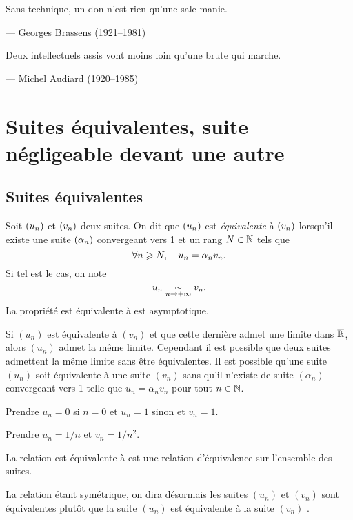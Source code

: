 \documentclass{magnolia}
\begin{document}
\setlength{}
\epigraph{\og Sans technique, un don n'est rien qu'une sale manie.\fg}{--- {\sc Georges Brassens (1921--1981)}}
\setlength{}
\epigraph{\og Deux intellectuels assis vont moins loin qu'une brute qui marche. \fg}{--- {\sc Michel Audiard (1920--1985)}}

\magtoc


\section{Suites équivalentes, suite négligeable devant une autre}

\subsection{Suites équivalentes}

\begin{definition}[utile=-3]
Soit $\left(u_n\right)$ et $\left(v_n\right)$ deux suites. On dit que $\left(u_n\right)$ est \emph{équivalente} à
$\left(v_n\right)$ lorsqu'il existe une suite $\left(\alpha_n\right)$ convergeant vers 1 et un rang
$N\in\mathbb{N}$ tels que
\[\forall n\geqslant N ,\quad u_n=\alpha_n v_n.\]
Si tel est le cas, on note
\[u_n \underset{n\rightarrow +\infty}{\sim} v_n.\]
La propriété \og est équivalente à \fg est asymptotique.
\end{definition}

\begin{remarques}
\remarque Si $(u_n)$ est équivalente à $(v_n)$ et que cette dernière admet une
  limite dans $\overline{\mathbb{R}}$, alors $(u_n)$ admet la même limite. Cependant
  il est possible que deux suites admettent la même limite sans être
  équivalentes.
\remarque Il est possible qu'une suite $(u_n)$ soit équivalente à une suite
  $(v_n)$ sans qu'il n'existe de suite $(\alpha_n)$ convergeant vers 1 telle que
  $u_n=\alpha_n v_n$ pour tout $n\in\mathbb{N}$.
  \begin{sol}
  Prendre $u_n=0$ si $n=0$ et $u_n=1$ sinon et $v_n=1$.
  \end{sol}
\end{remarques}
\begin{sol}
Prendre $u_n=1/n$ et $v_n=1/n^2$.
\end{sol}

\begin{proposition}[utile=-3]
La relation \og est équivalente à \fg est une relation d'équivalence sur
l'ensemble des suites.
\end{proposition}

\begin{remarqueUnique}
\remarque La relation étant symétrique, on dira désormais \og les suites $(u_n)$
  et $(v_n)$ sont équivalentes \fg plutôt que \og la suite $(u_n)$ est
  équivalente à la suite $(v_n)$ \fg.
\end{remarqueUnique}
\end{document}
